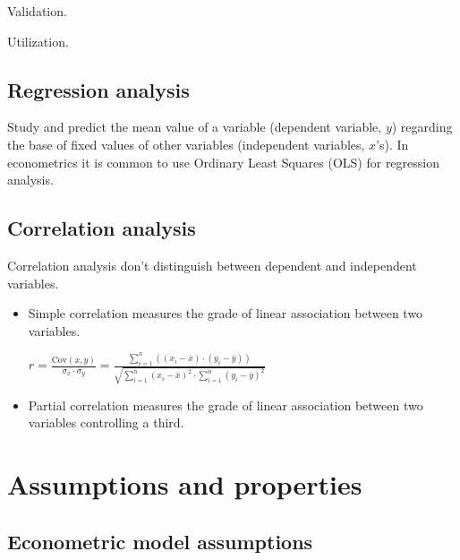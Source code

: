 \documentclass[10pt, a4paper, landscape]{article}
\newcommand{\Cov}{\mathrm{Cov}}
\begin{document}
\begin{multicols}{3}
\begin{enumerate}[leftmargin=*]
\begin{multicols}{2}
				\columnbreak
				
				\item Validation.
				\item Utilization.
			\end{multicols}
		\end{enumerate}
		
		\subsection*{Regression analysis}
		
		Study and predict the mean value of a variable (dependent variable, $y$) regarding the base of fixed values of other variables (independent variables, $x$'s). In econometrics it is common to use Ordinary Least Squares (OLS) for regression analysis.
		
		\subsection*{Correlation analysis}
		
		Correlation analysis don't distinguish between dependent and independent variables.
		
		\begin{itemize}[leftmargin=*]
			\item Simple correlation measures the grade of linear association between two variables.
			
			\begin{center}
				$r = \frac{\Cov(x, y)}{\sigma_{x} \cdot \sigma_{y}} = \frac{\sum_{i=1}^{n} ((x_{i} - \overline{x}) \cdot (y_{i} - \overline{y}))}{\sqrt{\sum_{i=1}^{n} (x_{i} - \overline{x})^{2} \cdot \sum_{i=1}^{n} (y_{i} - \overline{y})^{2}}}$
			\end{center}
			
			\item Partial correlation measures the grade of linear association between two variables controlling a third.
		\end{itemize}
		
		\columnbreak
		
		\section*{Assumptions and properties}
		
		\subsection*{Econometric model assumptions}
		

\end{multicols}
\end{document}
